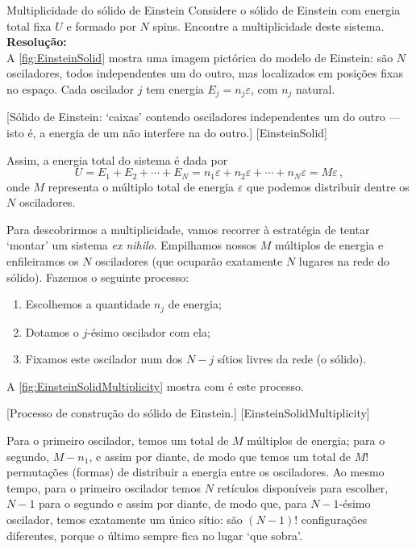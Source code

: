     \begin{example}{Multiplicidade do sólido de Einstein}{}
        Considere o sólido de Einstein com energia total fixa $U$ e formado por $N$ spins. Encontre a multiplicidade deste sistema.
        \tcblower
        \noindent\textbf{Resolução:}\\
        \indent A \cref{fig:EinsteinSolid} mostra uma imagem pictórica do modelo de Einstein: são $N$ osciladores, todos independentes um do outro, mas localizados em posições fixas no espaço. Cada oscilador $j$ tem energia $E_j=n_j\varepsilon$, com $n_j$ natural.
        
        \tikzFig%
        {\EinsteinSolid[5][5][0.8]}%
        [Sólido de Einstein: `caixas' contendo osciladores independentes um do outro --- isto é, a energia de um não interfere na do outro.]%
        [EinsteinSolid]

        Assim, a energia total do sistema é dada por \[U=E_1+E_2+\cdots+E_N=n_1\varepsilon+n_2\varepsilon+\cdots+n_N\varepsilon=M\varepsilon\,,\] onde $M$ representa o múltiplo total de energia $\varepsilon$ que podemos distribuir dentre os $N$ osciladores.

        Para descobrirmos a multiplicidade, vamos recorrer à estratégia de tentar `montar' um sistema \textit{ex nihilo}. Empilhamos nossos $M$ múltiplos de energia e enfileiramos os $N$ osciladores (que ocuparão exatamente $N$ lugares na rede do sólido). Fazemos o seguinte processo:
        \begin{enumerate}
            \item Escolhemos a quantidade $n_j$ de energia;
            \item Dotamos o $j$-ésimo oscilador com ela;
            \item Fixamos este oscilador num dos $N-j$ sítios livres da rede (o sólido).
        \end{enumerate}
        A \cref{fig:EinsteinSolidMultiplicity} mostra com é este processo.
        
        \tikzFig%
            {\EinsteinSolidMultiplicity}%
            [Processo de construção do sólido de Einstein.]%
            [EinsteinSolidMultiplicity]

        Para o primeiro oscilador, temos um total de $M$ múltiplos de energia; para o segundo, $M-n_1$, e assim por diante, de modo que temos um total de $M!$ permutações (formas) de distribuir a energia entre os osciladores. Ao mesmo tempo, para o primeiro oscilador temos $N$ retículos disponíveis para escolher, $N-1$ para o segundo e assim por diante, de modo que, para $N-1$-ésimo oscilador, temos exatamente um único sítio: são $(N-1)!$ configurações diferentes, porque o último sempre fica no lugar `que sobra'.


\end{example}
